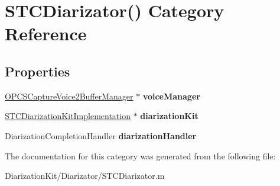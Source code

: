 \hypertarget{category_s_t_c_diarizator_07_08}{}\section{S\+T\+C\+Diarizator() Category Reference}
\label{category_s_t_c_diarizator_07_08}
\subsection*{Properties}
\begin{DoxyCompactItemize}
\item 
\hypertarget{category_s_t_c_diarizator_07_08_acc1ed18c67d94974fc82f72dd46e7fe9}{}\label{category_s_t_c_diarizator_07_08_acc1ed18c67d94974fc82f72dd46e7fe9} 
\hyperlink{interface_o_p_c_s_capture_voice2_buffer_manager}{O\+P\+C\+S\+Capture\+Voice2\+Buffer\+Manager} $\ast$ {\bfseries voice\+Manager}
\item 
\hypertarget{category_s_t_c_diarizator_07_08_a988d0e124d46205a06fa340869d238e1}{}\label{category_s_t_c_diarizator_07_08_a988d0e124d46205a06fa340869d238e1} 
\hyperlink{interface_s_t_c_diarization_kit_implementation}{S\+T\+C\+Diarization\+Kit\+Implementation} $\ast$ {\bfseries diarization\+Kit}
\item 
\hypertarget{category_s_t_c_diarizator_07_08_acb51f8edc491efefa9bca666d5359f31}{}\label{category_s_t_c_diarizator_07_08_acb51f8edc491efefa9bca666d5359f31} 
Diarization\+Completion\+Handler {\bfseries diarization\+Handler}
\end{DoxyCompactItemize}


The documentation for this category was generated from the following file\+:\begin{DoxyCompactItemize}
\item 
Diarization\+Kit/\+Diarizator/S\+T\+C\+Diarizator.\+m\end{DoxyCompactItemize}
